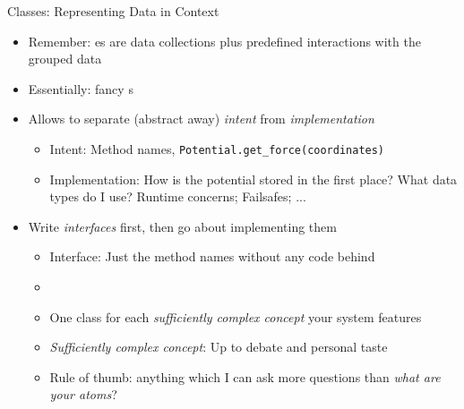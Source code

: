 
\begin{frame}{Classes: Representing Data in Context}
%
\begin{itemize}
\item Remember: es are data collections plus predefined interactions with the grouped data
\item Essentially: fancy s
\item Allows to separate (abstract away) \emph{intent} from \emph{implementation}
	\begin{itemize}
	\item Intent: Method names, \zB \texttt{Potential.get\_force(coordinates)}
	\item Implementation: How is the potential stored in the first place? What data types do I use? Runtime concerns; Failsafes; ...
	\end{itemize}
\item Write \emph{interfaces} first, then go about implementing them
	\begin{itemize}
	\item Interface: Just the method names without any code behind
	\item {}
	\item One class for each \emph{sufficiently complex concept} your system features
	\item \emph{Sufficiently complex concept}: Up to debate and personal taste
	\item Rule of thumb: anything which I can ask more questions than \emph{what are your atoms}?
	\end{itemize}
\end{itemize}
%
\end{frame}


